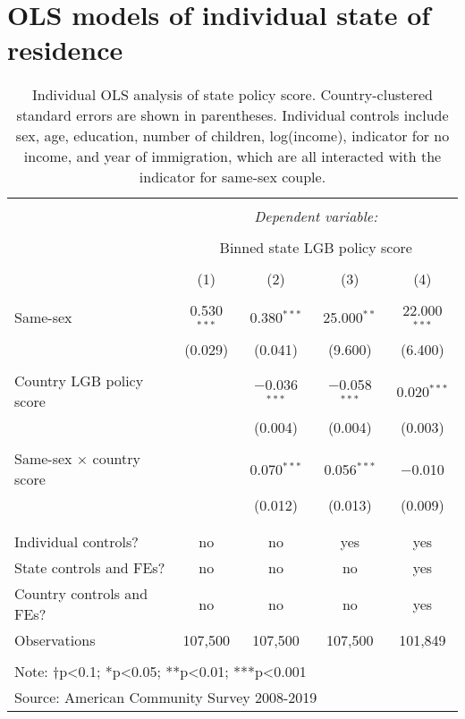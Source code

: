 \documentclass[
  11pt,
]{article}
\begin{document}
\newpage

\hypertarget{ols-models-of-individual-state-of-residence}{%
\section{OLS models of individual state of residence}\label{ols-models-of-individual-state-of-residence}}

\begin{table}[!htbp] \centering 
  \caption{Individual OLS analysis of state policy score. Country-clustered standard errors are shown in parentheses. Individual controls include sex, age, education, number of children, log(income), indicator for no income, and year of immigration, which are all interacted with the indicator for same-sex couple.} 
  \label{tab:ols} 
\begin{tabular}{@{\extracolsep{5pt}}lcccc} 
\\[-1.8ex]\hline 
\hline \\[-1.8ex] 
 & \multicolumn{4}{c}{\textit{Dependent variable:}} \\ 
\cline{2-5} 
\\[-1.8ex] & \multicolumn{4}{c}{Binned state LGB policy score} \\ 
\\[-1.8ex] & (1) & (2) & (3) & (4)\\ 
\hline \\[-1.8ex] 
 Same-sex & 0.530$^{***}$ & 0.380$^{***}$ & 25.000$^{**}$ & 22.000$^{***}$ \\ 
  & (0.029) & (0.041) & (9.600) & (6.400) \\ 
  & & & & \\ 
 Country LGB policy score &  & $-$0.036$^{***}$ & $-$0.058$^{***}$ & 0.020$^{***}$ \\ 
  &  & (0.004) & (0.004) & (0.003) \\ 
  & & & & \\ 
 Same-sex × country score &  & 0.070$^{***}$ & 0.056$^{***}$ & $-$0.010 \\ 
  &  & (0.012) & (0.013) & (0.009) \\ 
  & & & & \\ 
\hline \\[-1.8ex] 
Individual controls? & no & no & yes & yes \\ 
State controls and FEs? & no & no & no & yes \\ 
Country controls and FEs? & no & no & no & yes \\ 
Observations & 107,500 & 107,500 & 107,500 & 101,849 \\ 
\hline 
\hline \\[-1.8ex] 
\multicolumn{5}{l}{Note: †p<0.1; *p<0.05; **p<0.01; ***p<0.001} \\ 
\multicolumn{5}{l}{Source: American Community Survey 2008-2019} \\ 
\end{tabular} 
\end{table}
\end{document}
